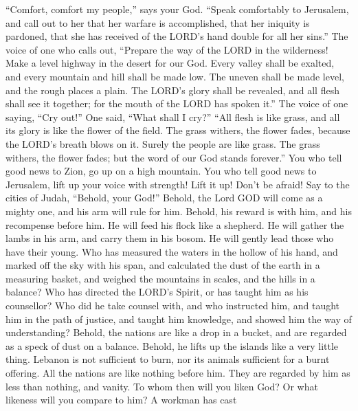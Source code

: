  ``Comfort, comfort my people,'' says your God. 
``Speak comfortably to Jerusalem, and call out to her that her warfare
is accomplished, that her iniquity is pardoned, that she has received of
the LORD's hand double for all her sins.''  The voice of one
who calls out, ``Prepare the way of the LORD in the wilderness! Make a
level highway in the desert for our God.  Every valley shall
be exalted, and every mountain and hill shall be made low. The uneven
shall be made level, and the rough places a plain.  The
LORD's glory shall be revealed, and all flesh shall see it together; for
the mouth of the LORD has spoken it.''  The voice of one
saying, ``Cry out!'' One said, ``What shall I cry?'' ``All flesh is like
grass, and all its glory is like the flower of the field. 
The grass withers, the flower fades, because the LORD's breath blows on
it. Surely the people are like grass.  The grass withers,
the flower fades; but the word of our God stands forever.'' 
You who tell good news to Zion, go up on a high mountain. You who tell
good news to Jerusalem, lift up your voice with strength! Lift it up!
Don't be afraid! Say to the cities of Judah, ``Behold, your God!''
 Behold, the Lord GOD will come as a mighty one, and his
arm will rule for him. Behold, his reward is with him, and his
recompense before him.  He will feed his flock like a
shepherd. He will gather the lambs in his arm, and carry them in his
bosom. He will gently lead those who have their young.  Who
has measured the waters in the hollow of his hand, and marked off the
sky with his span, and calculated the dust of the earth in a measuring
basket, and weighed the mountains in scales, and the hills in a balance?
 Who has directed the LORD's Spirit, or has taught him as
his counsellor?  Who did he take counsel with, and who
instructed him, and taught him in the path of justice, and taught him
knowledge, and showed him the way of understanding? 
Behold, the nations are like a drop in a bucket, and are regarded as a
speck of dust on a balance. Behold, he lifts up the islands like a very
little thing.  Lebanon is not sufficient to burn, nor its
animals sufficient for a burnt offering.  All the nations
are like nothing before him. They are regarded by him as less than
nothing, and vanity.  To whom then will you liken God? Or
what likeness will you compare to him?  A workman has cast

